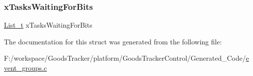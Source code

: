 \subsubsection{\texorpdfstring{x\+Tasks\+Waiting\+For\+Bits}{xTasksWaitingForBits}}
{\footnotesize\ttfamily \hyperlink{list_8h_afd590ef6400071b4d63d65ef90bea7f4}{List\+\_\+t} x\+Tasks\+Waiting\+For\+Bits}



The documentation for this struct was generated from the following file\+:\begin{DoxyCompactItemize}
\item 
F\+:/workspace/\+Goods\+Tracker/platform/\+Goods\+Tracker\+Control/\+Generated\+\_\+\+Code/\hyperlink{event__groups_8c}{event\+\_\+groups.\+c}\end{DoxyCompactItemize}
